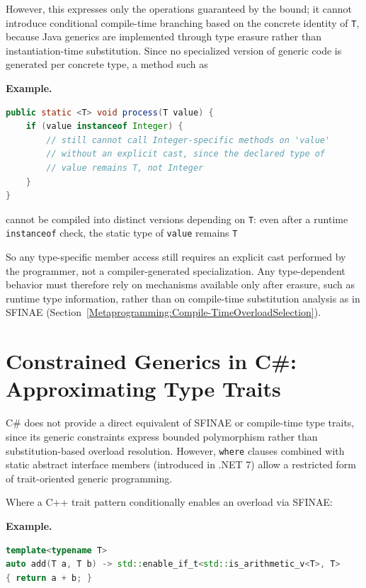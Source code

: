 \documentclass[11pt]{report}
\begin{document}
However, this expresses only the operations guaranteed by the bound; it
cannot introduce conditional compile-time branching based on the concrete
identity of \texttt{T}, because Java generics are implemented through type
erasure rather than instantiation-time substitution. Since no specialized
version of generic code is generated per concrete type, a method such as

\begin{examplebox}
\textbf{Example.}

\begin{lstlisting}[language=Java]
public static <T> void process(T value) {
    if (value instanceof Integer) {
        // still cannot call Integer-specific methods on 'value'
        // without an explicit cast, since the declared type of
        // value remains T, not Integer
    }
}
\end{lstlisting}
cannot be compiled into distinct versions depending on \texttt{T}: even
after a runtime \texttt{instanceof} check, the static type of \texttt{value}
remains \texttt{T}
\end{examplebox}

So any type-specific member access still requires an
explicit cast performed by the programmer, not a compiler-generated
specialization. Any type-dependent behavior must therefore rely on
mechanisms available only after erasure, such as runtime type information,
rather than on compile-time substitution analysis as in SFINAE
(Section~\ref{Metaprogramming:Compile-TimeOverloadSelection}).


\section{Constrained Generics in C\#: Approximating Type Traits}
\label{Metaprogramming:CSharpConstrainedGenerics}

C\# does not provide a direct equivalent of SFINAE or compile-time type
traits, since its generic constraints express bounded polymorphism rather
than substitution-based overload resolution. However, \texttt{where}
clauses combined with static abstract interface members (introduced in
.NET 7) allow a restricted form of trait-oriented generic programming.

Where a C++ trait pattern conditionally enables an overload via SFINAE:

\begin{examplebox}
\textbf{Example.}

\begin{lstlisting}[language=C++]
template<typename T>
auto add(T a, T b) -> std::enable_if_t<std::is_arithmetic_v<T>, T>
{ return a + b; }
\end{lstlisting}
\end{examplebox}
\end{document}

